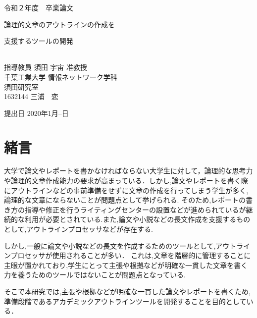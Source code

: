\documentclass[a4j,12pt]{jarticle}
\begin{document}
\begin{center}
\thispagestyle{empty}
\vspace*{5zh}
\huge
令和２年度　卒業論文\\[50pt]
{\Huge 論理的文章のアウトラインの作成を

支援するツールの開発}\\
[80pt]
\huge
指導教員 須田 宇宙 准教授\\[30pt]
千葉工業大学 情報ネットワーク学科\\[10pt]
須田研究室\\[60pt]
1632144 \hspace{70pt} 三浦　恋\\[75pt]
\end{center}
\vspace*{-2cm}
\begin{flushright} 
\huge
提出日 2020年1月--日
\end{flushright}

\newpage
{}
\tableofcontents%
\newpage
{}
\listoffigures
\thispagestyle{empty}
\clearpage
\addtocounter{page}{-1}

\newpage

\section{緒言}

大学で論文やレポートを書かなければならない大学生に対して，論理的な思考力や論理的文章作成能力の要求が高まっている．しかし,論文やレポートを書く際にアウトラインなどの事前準備をせずに文章の作成を行ってしまう学生が多く,論理的な文章にならないことが問題点として挙げられる.
そのため,レポートの書き方の指導や修正を行うライティングセンターの設置などが進められているが継続的な利用が必要とされている.また,論文や小説などの長文作成を支援するものとして,アウトラインプロセッサなどが存在する.

しかし,一般に論文や小説などの長文を作成するためのツールとして,アウトラインプロセッサが使用されることが多い．
これは,文章を階層的に管理することに主眼が置かれており,学生にとって主張や根拠などが明確な一貫した文章を書く力を養うためのツールではないことが問題点となっている.

そこで本研究では,主張や根拠などが明確な一貫した論文やレポートを書くため,準備段階であるアカデミックアウトラインツールを開発することを目的としている．
\newpage
\end{document}
